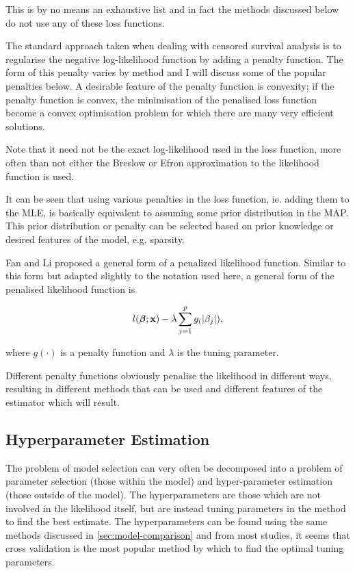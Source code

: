 This is by no means an exhaustive list and in fact the methods discussed below do not use any of these loss functions.

The standard approach taken when dealing with censored survival analysis is to regularise the negative log-likelihood function by adding a penalty function. The form of this penalty varies by method and I will discuss some of the popular penalties below. A desirable feature of the penalty function is convexity; if the penalty function is convex, the minimisation of the penalised loss function become a convex optimisation problem for which there are many very efficient solutions.

Note that it need not be the exact log-likelihood used in the loss function, more often than not either the Breslow or Efron approximation to the likelihood function is used.

It can be seen that using various penalties in the loss function, ie. adding them to the MLE, is basically equivalent to assuming some prior distribution in the MAP. This prior distribution or penalty can be selected based on prior knowledge or desired features of the model, e.g. sparsity.

Fan and Li  proposed a general form of a penalized likelihood function. Similar to this form but adapted slightly to the notation used here, a general form of the penalised likelihood function is

\begin{equation}\label{eqn:general-penalised-likelihood}
    l(\boldsymbol{\beta};\textbf{x})-\lambda\sum_{j=1}^pg_(|\beta_j|),
\end{equation}

where $g(\cdot)$ is a penalty function and $\lambda$ is the tuning parameter.

Different penalty functions obviously penalise the likelihood in different ways, resulting in different methods that can be used and different features of the estimator which will result.

\subsection{Hyperparameter Estimation}

The problem of model selection can very often be decomposed into a problem of parameter selection (those within the model) and hyper-parameter estimation (those outside of the model). The hyperparameters are those which are not involved in the likelihood itself, but are instead tuning parameters in the method to find the best estimate. The hyperparameters can be found using the same methods discussed in \cref{sec:model-comparison} and from most studies, it seems that cross validation is the most popular method by which to find the optimal tuning parameters. 

